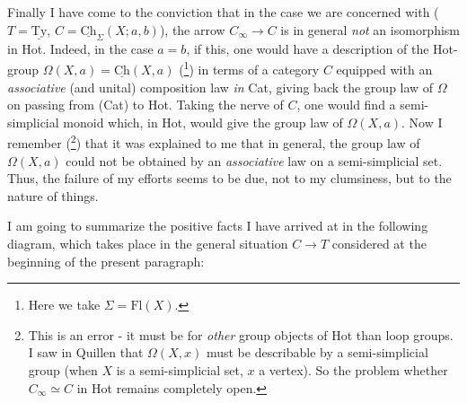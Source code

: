 \documentclass[11pt]{article}
\newcommand{\msp}[1]{\marginpar{\footnotesize [#1]}}
\newcommand{\Ch}{\underline{\mathrm{Ch}}}
\newcommand{\Ty}{\underline{\mathrm{Ty}}}
\begin{document}
Finally I have come to the conviction that in the case we are concerned with ($T = \Ty$, $C = \Ch_{\Sigma}(X;a,b)$), the arrow $C_{\infty} \longrightarrow C$ is in general \textit{not} an isomorphism in Hot. Indeed, in the case $a = b$, if this,
\msp{page 113}
one would have a description of the Hot-group $\Omega(X,a) = \Ch(X,a)$ (\footnote[23]{Here we take $\Sigma = \mathrm{Fl}(X)$.}) in terms of a category $C$ equipped with an \textit{associative} (and unital) composition law \textit{in} Cat, giving back the group law of $\Omega$ on passing from (Cat) to Hot. Taking the nerve of $C$, one would find a semi-simplicial monoid which, in Hot, would give the group law of $\Omega(X,a)$. Now I remember (\footnote[24]{This is an error - it must be for \textit{other} group objects of Hot than loop groups. I saw in Quillen that $\Omega(X,x)$ must be describable by a semi-simplicial group (when $X$ is a semi-simplicial set, $x$ a vertex). So the problem whether $C_{\infty} \simeq C$ in Hot remains completely open.}) that it was explained to me that in general, the group law of $\Omega(X,a)$ could not be obtained by an \textit{associative} law on a semi-simplicial set. Thus, the failure of my efforts seems to be due, not to my clumsiness, but to the nature of things. %

I am going to summarize the positive facts I have arrived at in the following diagram, which takes place in the general situation $C \longrightarrow T$ considered at the beginning of the present paragraph:
\end{document}
